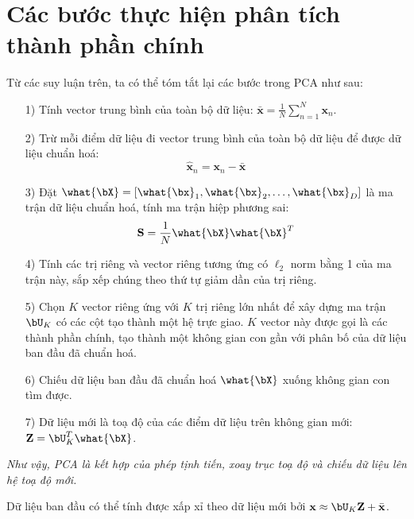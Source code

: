 \section{Các bước thực hiện phân tích thành phần chính}
Từ các suy luận trên, ta có thể tóm tắt lại các bước trong PCA như sau: 
\begin{itemize}
    \item[1)] Tính vector trung bình của toàn bộ dữ liệu:
       \begin{math} 
       \bar{\mathbf{x}} = \frac{1}{N} \sum_{n=1}^N \mathbf{x}_n 
       \end{math}.
    \item[2)] Trừ mỗi điểm dữ liệu đi vector trung bình của toàn bộ dữ liệu để được dữ
    liệu chuẩn hoá:
       \begin{equation} 
       \hat{\mathbf{x}}_n = \mathbf{x}_n - \bar{\mathbf{x}} 
       \end{equation} 
    \item[3)] Đặt $\what{\bX} = [\what{\bx}_1, \what{\bx}_2, \dots,
    \what{\bx}_D]$ là ma trận dữ liệu chuẩn hoá, tính ma trận hiệp phương sai:
       \begin{equation} 
       \mathbf{S} = \frac{1}{N}\what{\bX}\what{\bX}^T 
       \end{equation} 
    \item[4)] Tính các trị riêng và vector riêng tương ứng có $\ell_2$ norm bằng 1
    của ma trận này, sắp xếp chúng theo thứ tự giảm dần của trị riêng.
    \item[5)] Chọn $K$ vector riêng ứng với $K$ trị riêng lớn nhất để xây dựng ma trận $\bU_K$ có các cột tạo thành một hệ trực giao. $K$ vector này được gọi là các thành phần chính, tạo thành một không gian con {gần} với phân bố của dữ liệu ban đầu đã chuẩn hoá. 
    \item[6)] Chiếu dữ liệu ban đầu đã chuẩn hoá $\what{\bX}$ xuống không gian con tìm được. 
    \item[7)] Dữ liệu mới là toạ độ của các điểm dữ liệu trên không gian mới: 
       \begin{math} 
       \mathbf{Z} = \bU_K^T\what{\bX} 
       \end{math}.
\end{itemize}

\textit{Như vậy, PCA là kết hợp của phép tịnh tiến, xoay trục toạ độ và chiếu dữ liệu lên hệ toạ độ mới.} 

Dữ liệu ban đầu có thể tính được xấp xỉ theo dữ liệu mới bởi 
\begin{math} 
    \mathbf{x} \approx \bU_K\mathbf{Z} + \bar{\mathbf{x}} 
\end{math}.

